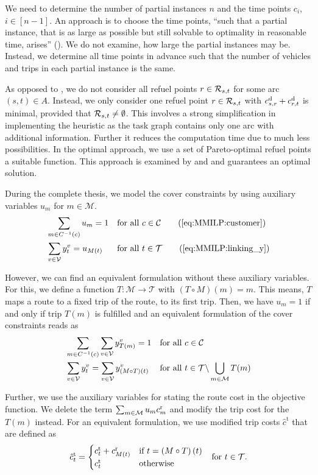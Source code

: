 We need to determine the number of partial instances $n$ and the time points $c_i$, ${i\in[n-1]}$. An approach is to choose the time points, \enquote{such that a partial instance, that is as large as possible but still solvable to optimality in reasonable time, arises} (\cite[p.~131]{Knoll}). We do not examine, how large the partial instances may be. Instead, we determine all time points in advance such that the number of vehicles and trips in each partial instance is the same. 

As opposed to , we do not consider all refuel points $r\in\mathcal{R}_{s,t}$ for some arc $(s,t)\in A$. Instead, we only consider one refuel point $r\in\mathcal{R}_{s,t}$ with ${c^{\operatorname{d}}_{s,r} + c^{\operatorname{d}}_{r,t}}$ is minimal, provided that ${\mathcal{R}_{s,t}\neq\emptyset}$. This involves a strong simplification in implementing the heuristic as the task graph contains only one arc with additional information. Further it reduces the computation time due to much less possibilities. In the optimal approach, we use a set of Pareto-optimal refuel points \wrt a suitable function. This approach is examined by \cite[Sec.~3.2.2]{Kaiser} and \cite[Sec.~3.2.2]{Knoll} and guarantees an optimal solution.

During the complete thesis, we model the cover constraints by using auxiliary variables $u_m$ for ${m\in\mathcal{M}}$.
\begin{align*}
	& \sum_{m\in C^{-1}(c)} u_m = 1 && \text{for all } c\in\mathcal{C} \tag{\ref{eq:MMILP:customer}} \\
	& \sum_{v\in\mathcal{V}} y^v_t = u_{M(t)} && \text{for all } t\in\mathcal{T} \tag{\ref{eq:MMILP:linking_y}}
\end{align*}

However, we can find an equivalent formulation without these auxiliary variables. For this, we define a function ${T:\mathcal{M}\to\mathcal{T}}$ with ${\left(T\circ M\right)(m)=m}$. This means, $T$ maps a route to a fixed trip of the route, \eg to its first trip. Then, we have ${u_m=1}$ if and only if trip $T(m)$ is fulfilled and an equivalent formulation of the cover constraints reads as
\begin{align*}
	& \sum_{m\in C^{-1}(c)} \sum_{v\in\mathcal{V}} y^v_{T(m)} = 1 && \text{for all } c\in\mathcal{C} \\
	& \sum_{v\in\mathcal{V}} y^v_t = \sum_{v\in\mathcal{V}} y^v_{(M\circ T)(t)} && \text{for all } t\in\mathcal{T}\backslash\bigcup_{m\in\mathcal{M}} T(m)
\end{align*}

Further, we use the auxiliary variables for stating the route cost in the objective function. We delete the term $\sum_{m\in\mathcal{M}} u_mc^{\operatorname{r}}_m$ and modify the trip cost for the $T(m)$ instead. For an equivalent formulation, we use modified trip costs $\hat{c}^{\operatorname{t}}$ that are defined as
\begin{align*}
	\hat{c}^{\operatorname{t}}_t = \begin{cases} c^{\operatorname{t}}_t + c^{\operatorname{r}}_{M(t)} & \text{if } t = \left(M\circ T\right)(t) \\ c^{\operatorname{t}}_t & \text{otherwise} \end{cases} && \text{for } t\in\mathcal{T}.
\end{align*}

